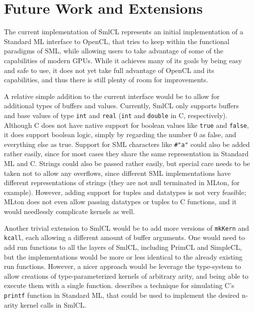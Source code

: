 \section{Future Work and Extensions}
\label{futurework}

The current implementation of SmlCL represents an initial
implementation of a Standard ML interface to OpenCL, that tries to
keep within the functional paradigms of SML, while allowing users to
take advantage of some of the capabilities of modern GPUs. While it
achieves many of its goals by being easy and safe to use, it does not
yet take full advantage of OpenCL and its capabilities, and thus there
is still plenty of room for improvements.

A relative simple addition to the current interface would be to
allow for additional types of buffers and values. Currently, SmlCL
only supports buffers and base values of type \texttt{int} and
\texttt{real} (\texttt{int} and \texttt{double} in C,
respectively). Although C does not have native support for boolean
values like \texttt{true} and \texttt{false}, it does support boolean
logic, simply by regarding the number $0$ as false, and everything
else as true.  Support for SML characters like \texttt{\#"a"} could
also be added rather easily, since for most cases they share the same
representation in Standard ML and C. Strings could also be passed
rather easily, but special care needs to be taken not to allow
any overflows, since different SML implementations have different
representations of strings (they are not null terminated in MLton, for
example). However, adding support for tuples and datatypes is not very
feasible; MLton does not even allow passing datatypes or tuples to C
functions, and it would needlessly complicate kernels as well.

Another trivial extension to SmlCL would be to add more versions of
\texttt{mkKern} and \texttt{kcall}, each allowing a different amount
of buffer arguments. One would need to add run functions to all the
layers of SmlCL, including PrimCL and SimpleCL, but the
implementations would be more or less identical to the already
existing run functions. However, a nicer approach would be leverage
the type-system to allow creations of type-parameterized kernels of
arbitrary arity, and being able to execute them with a single
function. \citet{danvy1998functional} describes a technique for
simulating C's \texttt{printf} function in Standard ML, that could be
used to implement the desired n-arity kernel calls in SmlCL.

